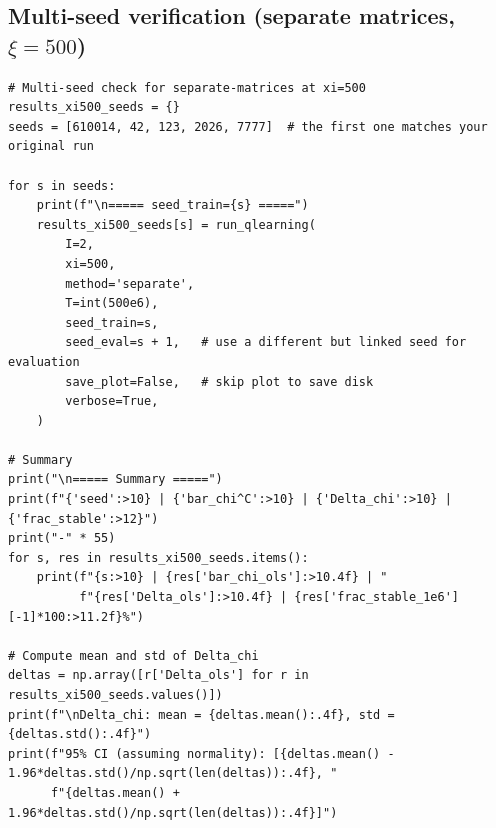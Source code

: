\subsection{Multi-seed verification (separate matrices, $\xi=500$)}

\begin{lstlisting}[style=pythonstyle]
# Multi-seed check for separate-matrices at xi=500
results_xi500_seeds = {}
seeds = [610014, 42, 123, 2026, 7777]  # the first one matches your original run

for s in seeds:
    print(f"\n===== seed_train={s} =====")
    results_xi500_seeds[s] = run_qlearning(
        I=2,
        xi=500,
        method='separate',
        T=int(500e6),
        seed_train=s,
        seed_eval=s + 1,   # use a different but linked seed for evaluation
        save_plot=False,   # skip plot to save disk
        verbose=True,
    )

# Summary
print("\n===== Summary =====")
print(f"{'seed':>10} | {'bar_chi^C':>10} | {'Delta_chi':>10} | {'frac_stable':>12}")
print("-" * 55)
for s, res in results_xi500_seeds.items():
    print(f"{s:>10} | {res['bar_chi_ols']:>10.4f} | "
          f"{res['Delta_ols']:>10.4f} | {res['frac_stable_1e6'][-1]*100:>11.2f}%")

# Compute mean and std of Delta_chi
deltas = np.array([r['Delta_ols'] for r in results_xi500_seeds.values()])
print(f"\nDelta_chi: mean = {deltas.mean():.4f}, std = {deltas.std():.4f}")
print(f"95% CI (assuming normality): [{deltas.mean() - 1.96*deltas.std()/np.sqrt(len(deltas)):.4f}, "
      f"{deltas.mean() + 1.96*deltas.std()/np.sqrt(len(deltas)):.4f}]")
\end{lstlisting}

